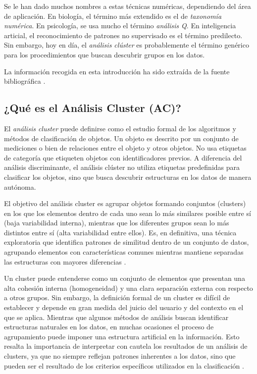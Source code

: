 Se le han dado muchos nombres a estas técnicas numéricas, dependiendo del área de aplicación. En biología, el término más extendido es el de \textit{taxonomía numérica}.
En psicología, se usa mucho el término \textit{análisis Q}. En inteligencia articial, el reconocimiento de patrones no supervisado es el término predilecto. Sin embargo,
hoy en día, el \textit{análisis clúster} es probablemente el término genérico para los procedimientos que buscan descubrir grupos en los datos. \newline

La información recogida en esta introducción ha sido extraída de la fuente bibliográfica \cite{clustering-2}. %

\subsection{¿Qué es el Análisis Cluster (AC)?}

El \textit{análisis cluster} puede definirse como el estudio formal de los algoritmos y métodos de clasificación de objetos. Un objeto es descrito por un conjunto de mediciones o
bien de relaciones entre el objeto y otros objetos. No usa etiquetas de categoría que etiqueten objetos con identificadores previos. A diferencia del análisis discriminante, el 
análisis clúster no utiliza etiquetas predefinidas para clasificar los objetos, sino que busca descubrir estructuras en los datos de manera autónoma. \newline

El objetivo del análisis cluster es agrupar objetos formando conjuntos (clusters) en los que los elementos dentro de cada uno sean lo más similares posible entre sí (baja 
variabilidad interna), mientras que los diferentes grupos sean lo más distintos entre sí (alta variabilidad entre ellos). Es, en definitiva, una técnica exploratoria que 
identifica patrones de similitud dentro de un conjunto de datos, agrupando elementos con características comunes mientras mantiene separadas 
las estructuras con mayores diferencias \cite{bejar-AC}.\newline %

Un cluster puede entenderse como un conjunto de elementos que presentan una alta cohesión interna (homogeneidad) y una clara separación externa con respecto a otros grupos. 
Sin embargo, la definición formal de un cluster es difícil de establecer y depende en gran medida del juicio del usuario y del contexto en el que se aplica. Mientras que 
algunos métodos de análisis buscan identificar estructuras naturales en los datos, en muchas ocasiones el proceso de agrupamiento puede imponer una estructura artificial 
en la información. Esto resalta la importancia de interpretar con cautela los resultados de un análisis de clusters, ya que no siempre reflejan patrones inherentes a los 
datos, sino que pueden ser el resultado de los criterios específicos utilizados en la clasificación \cite{clustering-2}. \newline %

